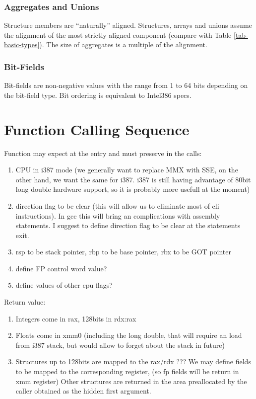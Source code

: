 \subsubsection{Aggregates and Unions}

Structure members are "`naturally"' aligned.  Structures, arrays and
unions assume the alignment of the most strictly aligned component
(compare with Table \ref{tab-basic-types}). The size of aggregates is
a multiple of the alignment.


\subsubsection{Bit-Fields}

Bit-fields are non-negative values with the range from 1 to 64 bits
depending on the bit-field type. Bit ordering is equivalent to
Intel386 specs.


\section{Function Calling Sequence}

Function may expect at the entry and must preserve in the calls:
\begin{enumerate}
\item CPU in i387 mode (we generally want to replace MMX with SSE, on the other
      hand, we want the same for i387.  i387 is still having advantage of 80bit
      long double hardware support, so it is probably more usefull at the moment)
\item direction flag to be clear (this will allow us to eliminate most of cli
      instructions).  In gcc this will bring an complications with assembly
      statements.  I suggest to define direction flag to be clear at the
      statements exit.
\item rsp to be stack pointer, rbp to be base pointer, rbx to be GOT pointer
\item define FP control word value?
\item define values of other cpu flags?
\end{enumerate}
Return value:
\begin{enumerate}
\item Integers come in rax, 128bits in rdx:rax
\item Floats come in xmm0 (including the long double, that will require an
      load from i387 stack, but would allow to forget about the stack in future)
\item Structures up to 128bits are mapped to the rax/rdx
      ??? We may define fields to be mapped to the corresponding register,
      (so fp fields will be return in xmm register)
      Other structures are returned in the area preallocated by the caller
      obtained as the hidden first argument.
\end{enumerate}

